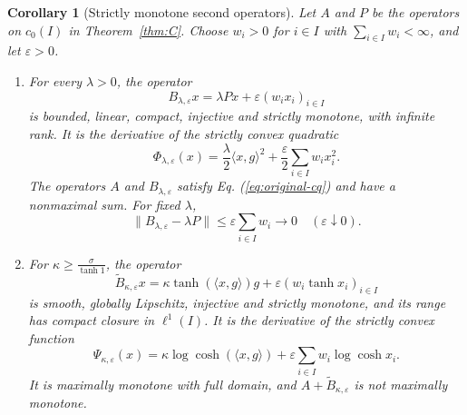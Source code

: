 \documentclass[11pt]{article}
\newcommand{\pair}[2]{\langle #1,#2\rangle}
\newtheorem{corollary}{Corollary}
\theoremstyle{definition}
\theoremstyle{remark}
\begin{document}
\begin{corollary}[Strictly monotone second operators]
\label{cor:strict-partners}
Let $A$ and $P$ be the operators on $c_0(I)$ in Theorem~\ref{thm:C}. Choose $w_i>0$ for $i\in I$ with $\sum_{i\in I}w_i<\infty$, and let $\varepsilon>0$.
\begin{enumerate}
\item For every $\lambda>0$, the operator
\[
B_{\lambda,\varepsilon}x=\lambda Px+\varepsilon(w_ix_i)_{i\in I}
\]
is bounded, linear, compact, injective and strictly monotone, with infinite rank. It is the derivative of the strictly convex quadratic
\[
\Phi_{\lambda,\varepsilon}(x)
=\frac{\lambda}{2}\pair{x}{g}^2
+\frac{\varepsilon}{2}\sum_{i\in I}w_ix_i^2.
\]
The operators $A$ and $B_{\lambda,\varepsilon}$ satisfy Eq. (\ref{eq:original-cq}) and have a nonmaximal sum. For fixed $\lambda$,
\[
\|B_{\lambda,\varepsilon}-\lambda P\|\le\varepsilon\sum_{i\in I}w_i\longrightarrow0
\quad(\varepsilon\downarrow0).
\]
\item For $\kappa\ge\frac{\sigma}{\tanh1}$, the operator
\[
\widetilde B_{\kappa,\varepsilon}x
=\kappa\tanh(\pair{x}{g})g
+\varepsilon(w_i\tanh x_i)_{i\in I}
\]
is smooth, globally Lipschitz, injective and strictly monotone, and its range has compact closure in $\ell^1(I)$. It is the derivative of the strictly convex function
\[
\Psi_{\kappa,\varepsilon}(x)
=\kappa\log\cosh(\pair{x}{g})
+\varepsilon\sum_{i\in I}w_i\log\cosh x_i.
\]
It is maximally monotone with full domain, and $A+\widetilde B_{\kappa,\varepsilon}$ is not maximally monotone.
\end{enumerate}
\end{corollary}
\end{document}
